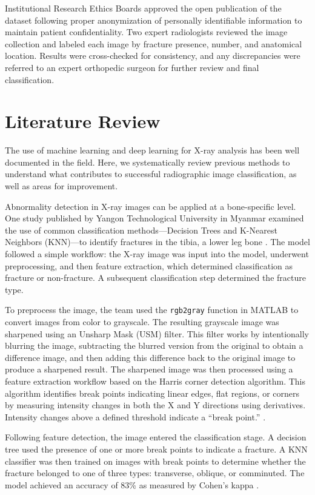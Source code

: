 \documentclass[conference]{IEEEtran}
\begin{document}
Institutional Research Ethics Boards approved the open publication of the dataset following proper anonymization of personally identifiable information to maintain patient confidentiality. Two expert radiologists reviewed the image collection and labeled each image by fracture presence, number, and anatomical location. Results were cross-checked for consistency, and any discrepancies were referred to an expert orthopedic surgeon for further review and final classification.
    
\section{Literature Review}

The use of machine learning and deep learning for X-ray analysis has been well documented in the field. Here, we systematically review previous methods to understand what contributes to successful radiographic image classification, as well as areas for improvement.

Abnormality detection in X-ray images can be applied at a bone-specific level. One study published by Yangon Technological University in Myanmar examined the use of common classification methods—Decision Trees and K-Nearest Neighbors (KNN)—to identify fractures in the tibia, a lower leg bone \cite{Myint2018LegFracture}. The model followed a simple workflow: the X-ray image was input into the model, underwent preprocessing, and then feature extraction, which determined classification as fracture or non-fracture. A subsequent classification step determined the fracture type.

To preprocess the image, the team used the \texttt{rgb2gray} function in MATLAB to convert images from color to grayscale. The resulting grayscale image was sharpened using an Unsharp Mask (USM) filter. This filter works by intentionally blurring the image, subtracting the blurred version from the original to obtain a difference image, and then adding this difference back to the original image to produce a sharpened result. The sharpened image was then processed using a feature extraction workflow based on the Harris corner detection algorithm. This algorithm identifies break points indicating linear edges, flat regions, or corners by measuring intensity changes in both the X and Y directions using derivatives. Intensity changes above a defined threshold indicate a ``break point.'' \cite{Myint2018LegFracture}. 

Following feature detection, the image entered the classification stage. A decision tree used the presence of one or more break points to indicate a fracture. A KNN classifier was then trained on images with break points to determine whether the fracture belonged to one of three types: transverse, oblique, or comminuted. The model achieved an accuracy of 83\% as measured by Cohen’s kappa \cite{Myint2018LegFracture}.
\end{document}

